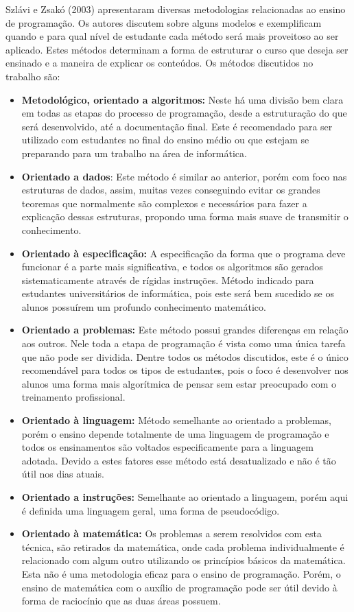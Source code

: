 \nocite{methods}
Szlávi e Zsakó (2003) apresentaram diversas metodologias relacionadas ao ensino de programação. Os autores discutem sobre alguns modelos e exemplificam quando e para qual nível de estudante cada método será mais proveitoso ao ser aplicado. Estes métodos determinam a forma de estruturar o curso que deseja ser ensinado e a maneira de explicar os conteúdos. Os métodos discutidos no trabalho são:

\vspace{-0.1in}
\begin{itemize}[leftmargin=-.001in]
\itemsep0em
\item \textbf{Metodológico, orientado a algoritmos:} Neste há uma divisão bem clara em todas as etapas do processo de programação, desde a estruturação do que será desenvolvido, até a documentação final. Este é recomendado para ser utilizado com estudantes no final do ensino médio ou que estejam se preparando para um trabalho na área de informática.
\item \textbf{Orientado a dados}: Este método é similar ao anterior, porém com foco nas estruturas de dados, assim, muitas vezes conseguindo evitar os grandes teoremas que normalmente são complexos e necessários para fazer a explicação dessas estruturas, propondo uma forma mais suave de transmitir o conhecimento.
\item \textbf{Orientado à especificação:} A especificação da forma que o programa deve funcionar é a parte mais significativa, e todos os algoritmos são gerados sistematicamente através de rígidas instruções. Método indicado para estudantes universitários de informática, pois este será bem sucedido se os alunos possuírem um profundo conhecimento matemático.
\item \textbf{Orientado a problemas:} Este método possui grandes diferenças em relação aos outros. Nele toda a etapa de programação é vista como uma única tarefa que não pode ser dividida. Dentre todos os métodos discutidos, este é o único recomendável para todos os tipos de estudantes, pois o foco é desenvolver nos alunos uma forma mais algorítmica de pensar sem estar preocupado com o treinamento profissional.
\item \textbf{Orientado à linguagem:} Método semelhante ao orientado a problemas, porém o ensino depende totalmente de uma linguagem de programação e todos os ensinamentos são voltados especificamente para a linguagem adotada. Devido a estes fatores esse método está desatualizado e não é tão útil nos dias atuais.
\item \textbf{Orientado a instruções:} Semelhante ao orientado a linguagem, porém aqui é definida uma linguagem geral, uma forma de pseudocódigo.
\item \textbf{Orientado à matemática:} Os problemas a serem resolvidos com esta técnica, são retirados da matemática, onde cada problema individualmente é relacionado com algum outro utilizando os princípios básicos da matemática. Esta não é uma metodologia eficaz para o ensino de programação. Porém, o ensino de matemática com o auxílio de programação pode ser útil devido à forma de raciocínio que as duas áreas possuem.
\end{itemize}
\vspace{-0.1in}

